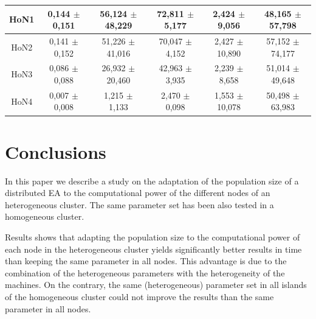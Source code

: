 \documentclass[final,1p,times]{elsarticle}
\begin{document}
\begin{table}[htb]
{\begin{tabular}{|c|c|c|c|c|c|}
HoN1 &   0,144 $\pm$  0,151 &  56,124 $\pm$ 48,229 & 72,811 $\pm$ 5,177  & 2,424 $\pm$  9,056  & 48,165  $\pm$57,798 \\ \hline
HoN2 &   0,141 $\pm$  0,152 &  51,226 $\pm$ 41,016 & 70,047 $\pm$ 4,152  & 2,427 $\pm$  10,890 & 57,152  $\pm$74,177 \\ \hline
HoN3 &   0,086 $\pm$  0,088 &  26,932 $\pm$ 20,460 & 42,963 $\pm$ 3,935  & 2,239 $\pm$  8,658  & 51,014  $\pm$49,648 \\ \hline
HoN4 &   0,007 $\pm$  0,008 &  1,215  $\pm$ 1,133  & 2,470  $\pm$ 0,098  & 1,553 $\pm$  10,078 & 50,498 $\pm$ 63,983 \\ \hline
\end{tabular}
}
\label{tab:onemaxtimes}
\end{table}

\section{Conclusions}


In this paper we describe a study on the adaptation of the population size of a distributed EA to the computational power of the different nodes of an heterogeneous cluster. The same parameter set has been also tested in a homogeneous cluster. 

Results shows that adapting the population size to the computational power of each node in the heterogeneous cluster yields significantly
better results in time than keeping the same parameter in all nodes. This advantage is due to the combination of the heterogeneous parameters with the heterogeneity of the machines. On the contrary, the same (heterogeneous) parameter set in all islands of the homogeneous cluster could not improve the results than the same parameter in all nodes.

\end{document}
